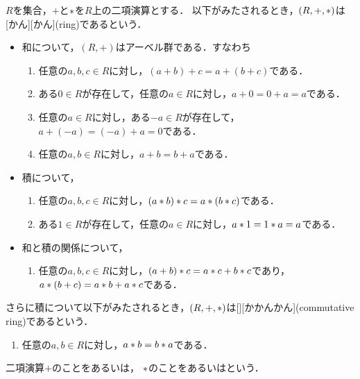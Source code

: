 \documentclass[../sotsu.tex]{subfiles}
\begin{document}
\begin{definition}[環]
    \label{dfn:ring}
    $R$を集合，$+$と$\mathbin{\ast}$を$R$上の二項演算とする．
    以下がみたされるとき，$(R, +, \mathbin{\ast})$は[かん][かん](ring)であるという．
    \begin{itemize}
        \item 和について，$(R, +)$はアーベル群である．すなわち
        \begin{enumerate}
            \item \label{ring:sum-associative} 任意の$a, b, c \in R$に対し，$(a + b) + c = a + (b + c)$である．
            \item \label{ring:sum-zero} ある$0 \in R$が存在して，任意の$a \in R$に対し，$a + 0 = 0 + a = a$である．
            \item \label{ring:sum-opposite} 任意の$a \in R$に対し，ある$-a \in R$が存在して，$a + (-a) = (-a) + a = 0$である．
            \item \label{ring:sum-commutative} 任意の$a, b \in R$に対し，$a + b = b + a$である．
        \end{enumerate}
        \item 積について，
        \begin{enumerate}[resume]
            \item \label{ring:prod-associative} 任意の$a, b, c \in R$に対し，$(a \mathbin{\ast} b) \mathbin{\ast} c = a \mathbin{\ast} (b \mathbin{\ast} c)$である．
            \item \label{ring:prod-one} ある$1 \in R$が存在して，任意の$a \in R$に対し，$a \mathbin{\ast} 1 = 1 \mathbin{\ast} a = a$である．
        \end{enumerate}
        \item 和と積の関係について，
        \begin{enumerate}[resume]
            \item \label{ring:distributive} 任意の$a, b, c \in R$に対し，$(a + b) \mathbin{\ast} c = a \mathbin{\ast} c + b \mathbin{\ast} c$であり，$a \mathbin{\ast} (b + c) = a \mathbin{\ast} b + a \mathbin{\ast} c$である．
        \end{enumerate}
    \end{itemize}
    さらに積について以下がみたされるとき，$(R, +, \mathbin{\ast})$は[][かかんかん](commutative ring)であるという．
    \begin{enumerate}[start=9]
        \item 任意の$a, b \in R$に対し，$a \mathbin{\ast} b = b \mathbin{\ast} a$である．
    \end{enumerate}
    二項演算$+$のことをあるいは，
    $\mathbin{\ast}$のことをあるいはという．
\end{definition}
\end{document}
